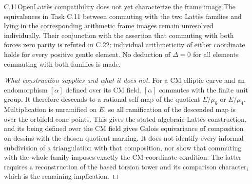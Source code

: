 \begin{statement}{C.11}{Open}{Latt\`es compatibility does not yet characterize the frame image}
The equivalences in Task C.11 between commuting with the two
Latt\`es families and lying in the corresponding arithmetic frame
images remain unresolved individually. Their conjunction with
the assertion that commuting with both forces zero parity is
refuted in C.22: individual arithmeticity of either coordinate
holds for every positive gentle element. No deduction of
$\Delta=0$ for all elements commuting with both families is made.
\end{statement}
\begin{proof}[What construction supplies and what it does not]
For a CM elliptic curve and an endomorphism $[\alpha]$ defined over
its CM field, $[\alpha]$ commutes with the finite unit group.
It therefore descends to a rational self-map of the quotient
$E/\mu_6$ or $E/\mu_4$. Multiplication is unramified on $E$, so
all ramification of the descended map is over the orbifold cone
points. This gives the stated algebraic Latt\`es construction,
and its being defined over the CM field gives Galois equivariance
of composition on dessins with the chosen quotient marking.
It does not identify every informal subdivision of a triangulation
with that composition, nor show that commuting with the whole
family imposes exactly the CM coordinate condition. The latter
requires a reconstruction of the based torsion tower and its
comparison character, which is the remaining implication.
\end{proof}

